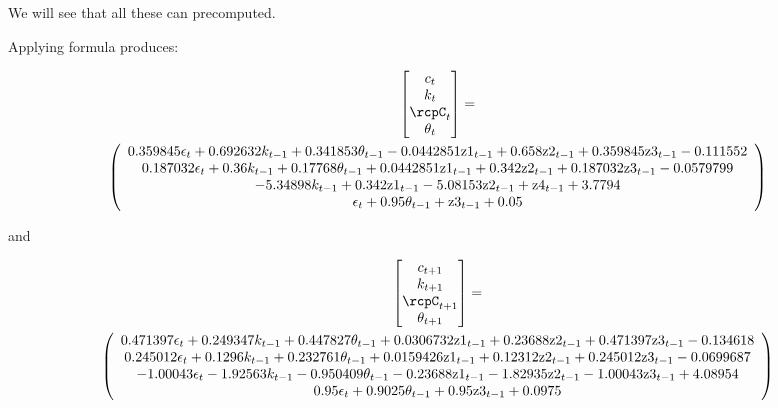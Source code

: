 \documentclass[12pt]{article}
\begin{document}
We will see that all these can precomputed.

Applying formula  produces:

{\tiny
\begin{gather}
  \begin{bmatrix}
c_t\\k_t\\ \rcpC_t\\\theta_t
  \end{bmatrix}=\\%
   \left(
   \begin{array}{c}
 0.359845 \epsilon _t+0.692632 k_{t-1}+0.341853 \theta _{t-1}-0.0442851
   \text{z1}_{t-1}+0.658 \text{z2}_{t-1}+0.359845 \text{z3}_{t-1}-0.111552 \\
 0.187032 \epsilon _t+0.36 k_{t-1}+0.17768 \theta _{t-1}+0.0442851
   \text{z1}_{t-1}+0.342 \text{z2}_{t-1}+0.187032 \text{z3}_{t-1}-0.0579799 \\
 -5.34898 k_{t-1}+0.342 \text{z1}_{t-1}-5.08153
   \text{z2}_{t-1}+\text{z4}_{t-1}+3.7794 \\
 \epsilon _t+0.95 \theta _{t-1}+\text{z3}_{t-1}+0.05 \\
   \end{array}
   \right)
\end{gather}
}

and 


{\tiny
\begin{gather}
  \begin{bmatrix}
c_{t+1}\\k_{t+1}\\ \rcpC_{t+1}\\\theta_{t+1}
  \end{bmatrix}=\\%
  \left(
   \begin{array}{c}
 0.471397 \epsilon _t+0.249347 k_{t-1}+0.447827 \theta _{t-1}+0.0306732
   \text{z1}_{t-1}+0.23688 \text{z2}_{t-1}+0.471397 \text{z3}_{t-1}-0.134618 \\
 0.245012 \epsilon_t+0.1296 k_{t-1}+0.232761 \theta _{t-1}+0.0159426
   \text{z1}_{t-1}+0.12312 \text{z2}_{t-1}+0.245012 \text{z3}_{t-1}-0.0699687 \\
 -1.00043 \epsilon _t-1.92563 k_{t-1}-0.950409 \theta _{t-1}-0.23688
   \text{z1}_{t-1}-1.82935 \text{z2}_{t-1}-1.00043 \text{z3}_{t-1}+4.08954 \\
 0.95 \epsilon _t+0.9025 \theta _{t-1}+0.95 \text{z3}_{t-1}+0.0975 \\
   \end{array}
   \right)
\end{gather}}
\end{document}
